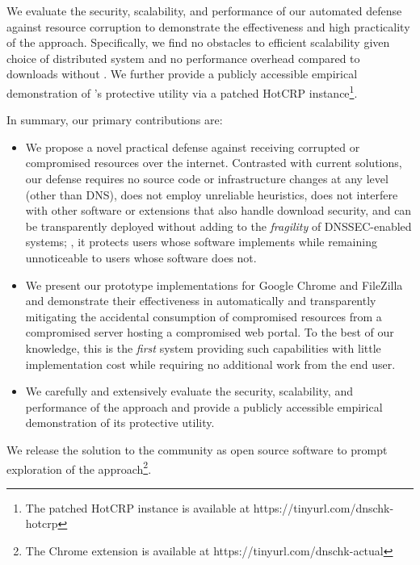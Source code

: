 We evaluate the security, scalability, and performance of our automated defense
against resource corruption to demonstrate the effectiveness and high
practicality of the \SYSTEM{} approach. Specifically, we find no obstacles to
efficient scalability given choice of distributed system and no performance
overhead compared to downloads without \SYSTEM{}. We further provide a publicly
accessible empirical demonstration of \SYSTEM{}'s protective utility via a
patched HotCRP instance\footnote{The patched HotCRP instance is available at
https://tinyurl.com/dnschk-hotcrp}.

In summary, our primary contributions are:

\begin{itemize}

  \item We propose a novel practical defense against receiving corrupted or
  compromised resources over the internet. Contrasted with current solutions,
  our defense requires no source code or infrastructure changes at any level
  (other than DNS), does not employ unreliable heuristics, does not interfere
  with other software or extensions that also handle download security, and can
  be transparently deployed without adding to the \textit{fragility} of
  DNSSEC-enabled systems; \ie, it protects users whose software implements
  \SYSTEM{} while remaining unnoticeable to users whose software does not.

  \item We present our prototype \SYSTEM{} implementations for Google Chrome and
  FileZilla and demonstrate their effectiveness in automatically and
  transparently mitigating the accidental consumption of compromised resources
  from a compromised server hosting a compromised web portal. To the best of our
  knowledge, this is the \emph{first} system providing such capabilities with
  little implementation cost while requiring no additional work from the end
  user.

  \item We carefully and extensively evaluate the security, scalability, and
  performance of the \SYSTEM{} approach and provide a publicly accessible
  empirical demonstration of its protective utility.

\end{itemize}

We release the \SYSTEM{} solution to the community as open source software to
prompt exploration of the \SYSTEM{} approach\footnote{The \SYSTEM{} Chrome
extension is available at https://tinyurl.com/dnschk-actual}.
